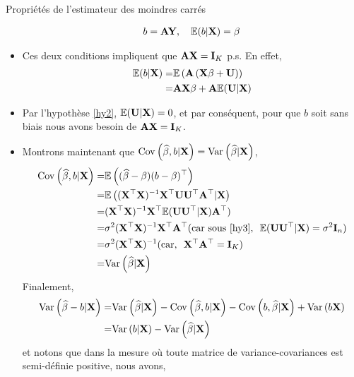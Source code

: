 \begin{frame}[allowframebreaks]{Propriétés de l'estimateur des moindres carrés}
\begin{itemize}
\begin{align*}
b=\mathbf{A}\mathbf{Y}, \ \ \ \mathbb{E}(b|\mathbf{X}) = \beta
\end{align*} 
\item Ces deux conditions impliquent que $\mathbf{A}\mathbf{X} =\mathbf{I}_K$ p.s. En effet,
\begin{align*}
\mathbb{E}(b | \mathbf{X}) = &\mathbb{E}\left(\mathbf{A}\left(\mathbf{X}\beta + \mathbf{U}\right)\right)\\
=&\mathbf{A}\mathbf{X}\beta + \mathbf{A}\mathbb{E}(\mathbf{U}| \mathbf{X})
\end{align*}
\item Par l'hypothèse \ref{hy2}, $\mathbb{E}(\mathbf{U} | \mathbf{X}) = 0$, et par conséquent, pour que $b$ soit sans biais nous avons besoin de $\mathbf{A}\mathbf{X} = \mathbf{I}_K$.
\item Montrons maintenant que $\mathrm{Cov}\left(\widehat{\beta}, b | \mathbf{X}\right) = \mathrm{Var}\left(\widehat{\beta} | \mathbf{X}\right)$,
\begin{align*}
\mathrm{Cov}\left(\widehat{\beta}, b | \mathbf{X}\right) =& \mathbb{E}\left((\widehat{\beta} - \beta)(b-\beta)^\top\right)\\
=&\mathbb{E}\left((\mathbf{X}^\top\mathbf{X})^{-1}\mathbf{X}^\top\mathbf{U}\mathbf{U}^\top\mathbf{A}^\top | \mathbf{X}\right)\\
=&(\mathbf{X}^\top\mathbf{X})^{-1}\mathbf{X}^\top\mathbb{E}(\mathbf{U}\mathbf{U}^\top|\mathbf{X})\mathbf{A}^\top)\\
=&\sigma^2(\mathbf{X}^\top\mathbf{X})^{-1}\mathbf{X}^\top\mathbf{A}^\top(\textrm{car sous \ref{hy3}, \  } \mathbb{E}(\mathbf{U}\mathbf{U}^\top| \mathbf{X}) = \sigma^2\mathbf{I}_n)\\
=&\sigma^2(\mathbf{X}^\top\mathbf{X})^{-1}(\textrm{car, \ } \mathbf{X}^\top\mathbf{A}^\top = \mathbf{I}_K)\\
=&\mathrm{Var}\left(\widehat{\beta}| \mathbf{X}\right)
\end{align*}
Finalement, 
\begin{align}
\mathrm{Var}\left(\widehat{\beta} - b | \mathbf{X}\right) =&\mathrm{Var}\left(\widehat{\beta}| \mathbf{X}\right) - \mathrm{Cov}\left(\widehat{\beta}, b | \mathbf{X}\right) - \mathrm{Cov}\left(b, \widehat{\beta} | \mathbf{X}\right) + \mathrm{Var}\left(b\mathbf{X}\right)\nonumber\\
=&   \mathrm{Var}\left(b | \mathbf{X}\right) - \mathrm{Var}\left(\widehat{\beta}| \mathbf{X}\right)
\label{eq14}
\end{align}
et notons que dans la mesure où toute matrice de variance-covariances est semi-définie positive, nous avons,
\begin{align*}

\end{align*}
\end{itemize}
\end{frame}
